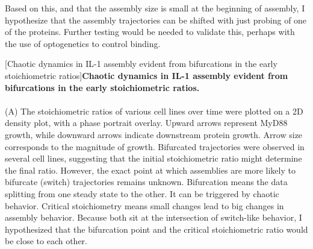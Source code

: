 Based on this, and that the assembly size is small at the beginning of assembly, I hypothesize that the assembly trajectories can be shifted with just probing of one of the proteins. Further testing would be needed to validate this, perhaps with the use of optogenetics to control binding.
 

\begin{centering}
[Chaotic dynamics in IL-1 assembly evident from bifurcations in the early stoichiometric ratios]{\textbf{Chaotic dynamics in IL-1 assembly evident from bifurcations in the early stoichiometric ratios.}
\\
\\
(A) The stoichiometric ratios of various cell lines over time were plotted on a 2D density plot, with a phase portrait overlay. Upward arrows represent MyD88 growth, while downward arrows indicate downstream protein growth. Arrow size corresponds to the magnitude of growth. Bifurcated trajectories were observed in several cell lines, suggesting that the initial stoichiometric ratio might determine the final ratio. However, the exact point at which assemblies are more likely to bifurcate (switch) trajectories remains unknown. Bifurcation means the data splitting from one steady state to the other. It can be triggered by chaotic behavior. Critical stoichiometry means small changes lead to big changes in assembly behavior. Because both sit at the intersection of switch-like behavior, I hypothesized that the bifurcation point and the critical stoichiometric ratio would be close to each other.
}
\end{centering}
